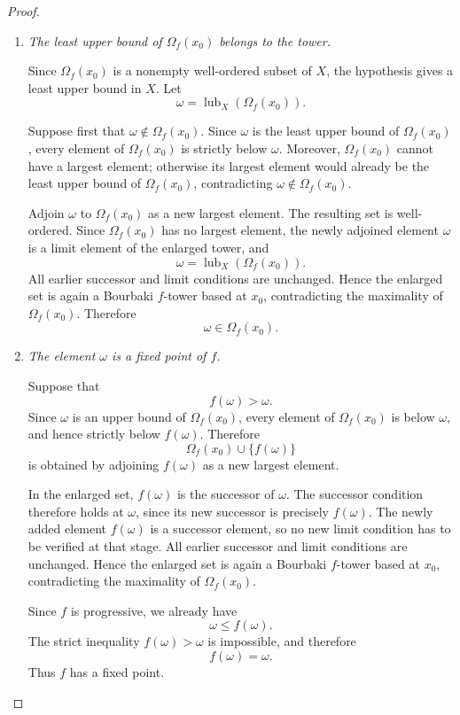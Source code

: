 \documentclass[10pt,a4paper]{amsart}
\newcommand{\lub}{\operatorname{lub}}
\begin{document}
\begin{proof}
\begin{enumerate}
By the preceding three steps, \(\Omega_f(x_0)\) is a Bourbaki \(f\)-tower. Therefore
\[
\Omega_f(x_0)\in\mathcal T.
\]
It is clearly the largest element of \(\mathcal T\) under inclusion.

\item \emph{The least upper bound of \(\Omega_f(x_0)\) belongs to the tower.}

Since \(\Omega_f(x_0)\) is a nonempty well-ordered subset of \(X\), the hypothesis gives
a least upper bound in \(X\). Let
\[
\omega=\lub_X(\Omega_f(x_0)).
\]

Suppose first that \(\omega\notin\Omega_f(x_0)\). Since \(\omega\) is the least upper
bound of \(\Omega_f(x_0)\), every element of \(\Omega_f(x_0)\) is strictly below
\(\omega\). Moreover, \(\Omega_f(x_0)\) cannot have a largest element; otherwise its
largest element would already be the least upper bound of \(\Omega_f(x_0)\), contradicting
\(\omega\notin\Omega_f(x_0)\).

Adjoin \(\omega\) to \(\Omega_f(x_0)\) as a new largest element. The resulting set is
well-ordered. Since \(\Omega_f(x_0)\) has no largest element, the newly adjoined element
\(\omega\) is a limit element of the enlarged tower, and
\[
\omega=\lub_X(\Omega_f(x_0)).
\]
All earlier successor and limit conditions are unchanged. Hence the enlarged set is again
a Bourbaki \(f\)-tower based at \(x_0\), contradicting the maximality of
\(\Omega_f(x_0)\). Therefore
\[
\omega\in\Omega_f(x_0).
\]

\item \emph{The element \(\omega\) is a fixed point of \(f\).}

Suppose that
\[
f(\omega)>\omega.
\]
Since \(\omega\) is an upper bound of \(\Omega_f(x_0)\), every element of
\(\Omega_f(x_0)\) is below \(\omega\), and hence strictly below \(f(\omega)\). Therefore
\[
\Omega_f(x_0)\cup\{f(\omega)\}
\]
is obtained by adjoining \(f(\omega)\) as a new largest element.

In the enlarged set, \(f(\omega)\) is the successor of \(\omega\). The successor condition
therefore holds at \(\omega\), since its new successor is precisely \(f(\omega)\). The
newly added element \(f(\omega)\) is a successor element, so no new limit condition has to
be verified at that stage. All earlier successor and limit conditions are unchanged. Hence
the enlarged set is again a Bourbaki \(f\)-tower based at \(x_0\), contradicting the
maximality of \(\Omega_f(x_0)\).

Since \(f\) is progressive, we already have
\[
\omega\leq f(\omega).
\]
The strict inequality \(f(\omega)>\omega\) is impossible, and therefore
\[
f(\omega)=\omega.
\]
Thus \(f\) has a fixed point.
\end{enumerate}
\end{proof}
\end{document}
